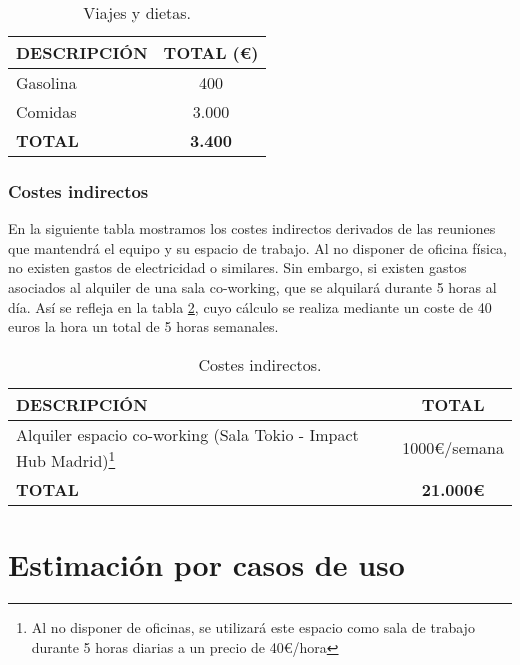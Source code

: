 \begin{table}[H]
\begin{center}
\begin{tabular}{l c}
\textbf{DESCRIPCIÓN} & \textbf{TOTAL (\euro)}\\ \hline \hline
Gasolina & 400\\
Comidas & 3.000\\ \hline \hline
\textbf{TOTAL} & \textbf{3.400}\\ \hline
\end{tabular}
\caption{Viajes y dietas.}
\label{tab:viajes}
\end{center}
\end{table}


\subsection{Costes indirectos}
En la siguiente tabla mostramos los costes indirectos derivados de las reuniones que mantendrá el equipo y su espacio de trabajo. Al no disponer de oficina física, no existen gastos de electricidad o similares. Sin embargo, si existen gastos asociados al alquiler de una sala co-working, que se alquilará durante 5 horas al día. Así se refleja en la tabla \ref{tab:indirectos}, cuyo cálculo se realiza mediante un coste de 40 euros la hora un total de 5 horas semanales.

\begin{table}[H]
\begin{center}
\begin{tabular}{l c}
\textbf{DESCRIPCIÓN} & \textbf{TOTAL}\\ \hline \hline
Alquiler espacio co-working (Sala Tokio - Impact Hub Madrid)\footnote{Al no disponer de oficinas, se utilizará este espacio como sala de trabajo durante 5 horas diarias a un precio de 40\euro/hora} & 1000\euro/semana\\ \hline \hline
\textbf{TOTAL} & \textbf{21.000\euro}\\ \hline
\end{tabular}
\caption{Costes indirectos.}
\label{tab:indirectos}
\end{center}
\end{table}

\appendix
\chapter{Estimación por casos de uso}\label{sec:apEst}

